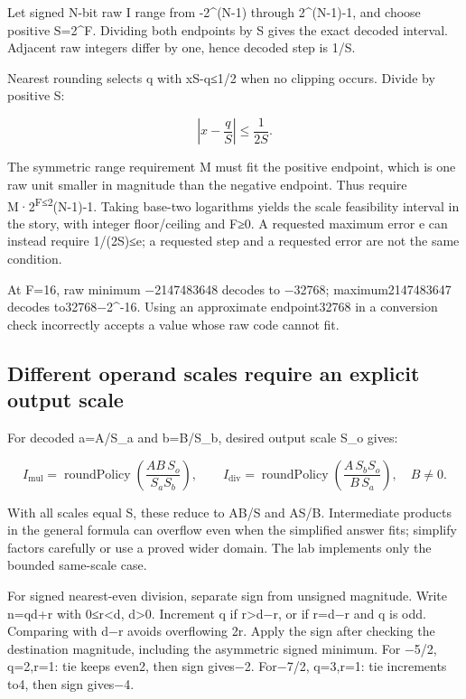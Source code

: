Let signed N-bit raw I range from -2\^{}(N-1) through 2\^{}(N-1)-1, and choose positive S=2\^{}F. Dividing both endpoints by S gives the exact decoded interval. Adjacent raw integers differ by one, hence decoded step is 1/S.

Nearest rounding selects q with \textbar xS-q\textbar≤1/2 when no clipping occurs. Divide by positive S:

\[
\left|x-\frac qS\right|\le\frac1{2S}.
\]

The symmetric range requirement M must fit the positive endpoint, which is one raw unit smaller in magnitude than the negative endpoint. Thus require M·2\textsuperscript{F≤2}(N-1)-1. Taking base-two logarithms yields the scale feasibility interval in the story, with integer floor/ceiling and F≥0. A requested maximum error e can instead require 1/(2S)≤e; a requested step and a requested error are not the same condition.

At F=16, raw minimum −2147483648 decodes to −32768; maximum2147483647 decodes to32768−2\^{}-16. Using an approximate endpoint32768 in a conversion check incorrectly accepts a value whose raw code cannot fit.

\subsection{Different operand scales require an explicit output scale}\label{01-foundations-i-ch011-different-operand-scales-require-an-explicit-output-scale}

For decoded a=A/S\_a and b=B/S\_b, desired output scale S\_o gives:

\[
I_{\mathrm{mul}}=\operatorname{roundPolicy}
  \left(\frac{AB\,S_o}{S_aS_b}\right),
\qquad
I_{\mathrm{div}}=\operatorname{roundPolicy}
  \left(\frac{A\,S_bS_o}{B\,S_a}\right),\quad B\ne0.
\]

With all scales equal S, these reduce to AB/S and AS/B. Intermediate products in the general formula can overflow even when the simplified answer fits; simplify factors carefully or use a proved wider domain. The lab implements only the bounded same-scale case.

For signed nearest-even division, separate sign from unsigned magnitude. Write n=qd+r with 0≤r\textless d, d\textgreater0. Increment q if r\textgreater d−r, or if r=d−r and q is odd. Comparing with d−r avoids overflowing 2r. Apply the sign after checking the destination magnitude, including the asymmetric signed minimum. For −5/2, q=2,r=1: tie keeps even2, then sign gives−2. For−7/2, q=3,r=1: tie increments to4, then sign gives−4.

